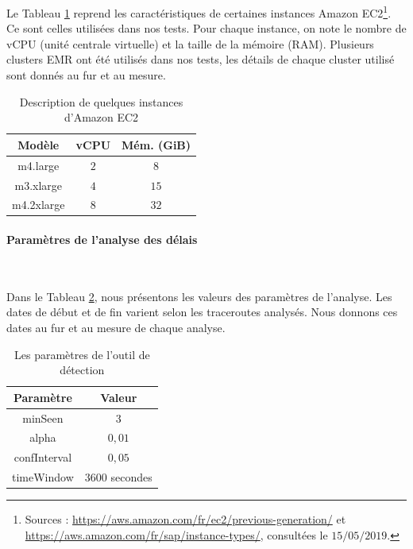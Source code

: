 Le Tableau \ref{instances-types-description} reprend  les caractéristiques de certaines instances Amazon EC2\footnote{Sources : \url{https://aws.amazon.com/fr/ec2/previous-generation/} et \url{https://aws.amazon.com/fr/sap/instance-types/}, consultées le $15/05/2019$.}. Ce sont celles utilisées dans nos tests. Pour chaque instance, on note le nombre de vCPU (unité centrale virtuelle) et la taille de la mémoire (RAM). Plusieurs clusters EMR ont été utilisés dans nos tests, les détails de chaque  cluster utilisé sont donnés au fur et au mesure.
\begin{table}[H]
	\centering
	\begin{tabular}{c c c}
		\hline 
		\textbf{Modèle} &	\textbf{vCPU} &\textbf{	Mém. (GiB)} \\ 
		\hline 
		m4.large&	$ 2 $&	$ 8 $ \\
		\hline 
		m3.xlarge&	$ 4 $&	$ 15 $\\
		\hline 
		m4.2xlarge&	$8  $&	$ 32 $ \\ 
		\hline 
	\end{tabular}
	\caption{Description de quelques instances d'Amazon EC2}
	\label{instances-types-description}
\end{table}

\paragraph{Paramètres de l'analyse des délais}~

 Dans le Tableau \ref{params-detection}, nous présentons les valeurs des paramètres de l'analyse. Les dates de début et de fin  varient selon les traceroutes analysés. Nous donnons ces dates au fur et au mesure de chaque analyse.

\begin{table}[h]
	\centering
	\begin{tabular}{c c }
		\hline 
	\textbf{Paramètre}	& \textbf{Valeur}  \\ 
		\hline 
	minSeen	& 3 \\ 
		\hline 
	alpha	&  $ 0,01 $\\ 
		\hline 
	confInterval	& $0,05$ \\ 
		\hline 
	timeWindow	&  $ 3600 $ secondes \\ 
		\hline 
	\end{tabular} 
\caption{Les paramètres  de l'outil de détection}
\label{params-detection}
\end{table}




